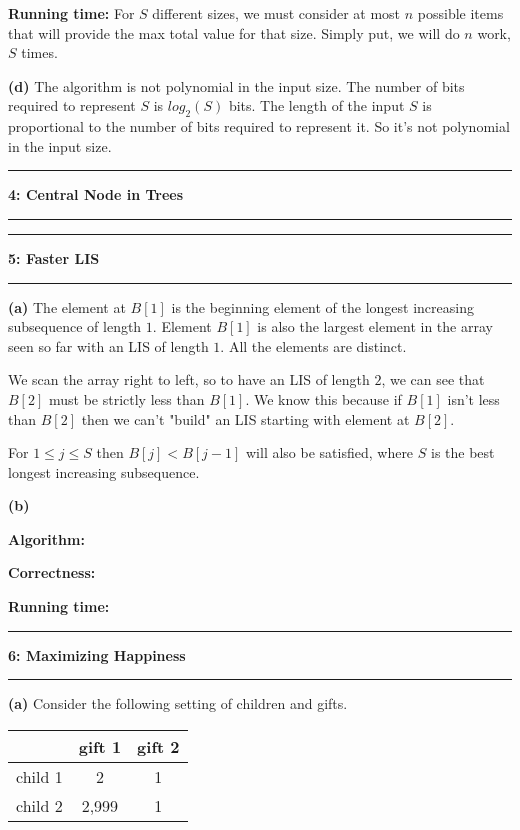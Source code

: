 \documentclass[11pt]{article}
\newcommand\question[2]{\vspace{.25in}\hrule\textbf{#1: #2}\vspace{.5em}\hrule\vspace{.10in}}
\renewcommand\part[1]{\vspace{.10in}\textbf{(#1)}}
\newcommand\algorith{\vspace{.10in}\textbf{Algorithm: }}
\newcommand\correctness{\vspace{.10in}\textbf{Correctness: }}
\newcommand\runtime{\vspace{.10in}\textbf{Running time: }}
\begin{document}
\runtime For $S$ different sizes, we must consider at most $n$ possible items that will provide the max total value for that size. Simply put, we will do $n$ work, $S$ times.


\part{d} The algorithm is not polynomial in the input size. The number of bits required to represent $S$ is $log_2(S)$ bits. The length of the input $S$ is proportional to the number of bits required to represent it. So it's not polynomial in the input size.


\question{4}{Central Node in Trees}

\question{5}{Faster LIS}

\part{a} The element at $B[1]$ is the beginning element of the longest increasing subsequence of length $1$. Element $B[1]$ is also the largest element in the array seen so far with an LIS of length $1$. All the elements are distinct. 

We scan the array right to left, so to have an LIS of length $2$, we can see that $B[2]$ must be strictly less than $B[1]$. We know this because if $B[1]$ isn't less than $B[2]$ then we can't "build" an LIS starting with element at $B[2]$.

For $1 \leq j \leq S$ then $B[j] < B[j-1]$ will also be satisfied, where $S$ is the best longest increasing subsequence.

\part{b}

\algorith

\correctness

\runtime

\question{6}{Maximizing Happiness}

\part{a} Consider the following setting of children and gifts.

\begin{table}[H]
\centering
{\renewcommand{\arraystretch}{1.2}%
\begin{tabular}{| c | c | c |}
\hline
& gift 1 & gift 2 \\ \hline
child 1 & 2& 1 \\ \hline
child 2 & 2,999& 1\\ \hline
\end{tabular}}
\end{table}
\end{document}
